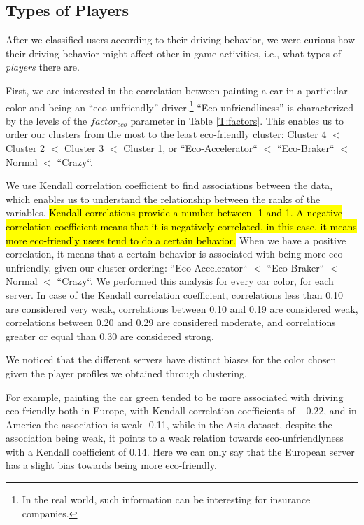 \documentclass[preprint,authoryear,12pt]{elsarticle}
\begin{document}
\subsection{Types of Players}

After we classified users according to their driving behavior, we were curious how their driving behavior might affect other in-game activities, i.e., what types of {\em players} there are.

First, we are interested in the correlation between painting a car in a particular color and being an ``eco-unfriendly'' driver.\footnote{In the real world, such information can be interesting for insurance companies.}
``Eco-unfriendliness'' is characterized by the levels of the $factor_{eco}$ parameter in Table \ref{T:factors}. This enables us to order our clusters from the most to the least eco-friendly cluster: Cluster 4 $<$ Cluster 2 $<$ Cluster 3 $<$ Cluster 1, or ``Eco-Accelerator``  $<$ ``Eco-Braker`` $<$  Normal $<$ ``Crazy``.

We use Kendall correlation coefficient to find associations between the data, which enables us to understand the relationship between the ranks of the variables. \hl{Kendall correlations provide a number between -1 and 1. A negative correlation coefficient means that it is negatively correlated, in this case, it means more eco-friendly users tend to do a certain behavior.} When we have a positive correlation, it means that a certain behavior is associated with being more eco-unfriendly, given our cluster ordering: ``Eco-Accelerator``  $<$ ``Eco-Braker`` $<$  Normal $<$ ``Crazy``.  We performed this analysis for every car color, for each server.
In case of the Kendall correlation coefficient, correlations less than 0.10 are considered very weak, correlations between 0.10 and 0.19 are considered weak, correlations between 0.20 and 0.29 are considered moderate, and correlations greater or equal than 0.30 are considered strong.

We noticed that the different servers have distinct biases for the color chosen given the player profiles we obtained through clustering. 


For example, painting the car green tended to be more associated with driving eco-friendly both in Europe, with Kendall correlation coefficients of $-$0.22, and in America the association is weak -0.11, while in the Asia dataset, despite the association being weak, it points to a weak relation towards eco-unfriendlyness with a Kendall coefficient of 0.14. Here we can only say that the European server has a slight bias towards being more eco-friendly. 
\end{document}
